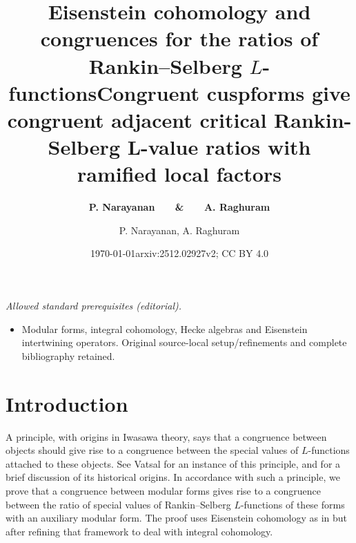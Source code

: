 \documentclass[11pt]{amsart}
\title[Eisenstein cohomology and congruences]{Eisenstein cohomology and congruences for the ratios of Rankin--Selberg $L$-functions}
\author{\bf P. Narayanan \ \ \ \& \ \ \ A. Raghuram}
\date{\today}
\title{Congruent cuspforms give congruent adjacent critical Rankin-Selberg L-value ratios with ramified local factors}
\author{P. Narayanan, A. Raghuram}
\date{arxiv:2512.02927v2; CC BY 4.0}
\begin{document}
\maketitle
\noindent\textit{Allowed standard prerequisites (editorial).}\begin{itemize}
\item Modular forms, integral cohomology, Hecke algebras and Eisenstein intertwining operators. Original source-local setup/refinements and complete bibliography retained.
\end{itemize}\medskip
\section{Introduction}
A principle, with origins in Iwasawa theory, says that a congruence between objects should give rise to a congruence between 
the special values of $L$-functions attached to these objects. 
See Vatsal \cite{vatsal} for an instance of this principle, and for a brief discussion of its historical origins.
In accordance with such a principle, we prove that a congruence 
between modular forms gives rise to a congruence between the ratio of special values of Rankin--Selberg $L$-functions of these forms with an auxiliary modular form. 
 The proof uses Eisenstein cohomology as in \cite{harder-raghuram} but after refining that framework to deal with integral cohomology.


\smallskip
\end{document}

